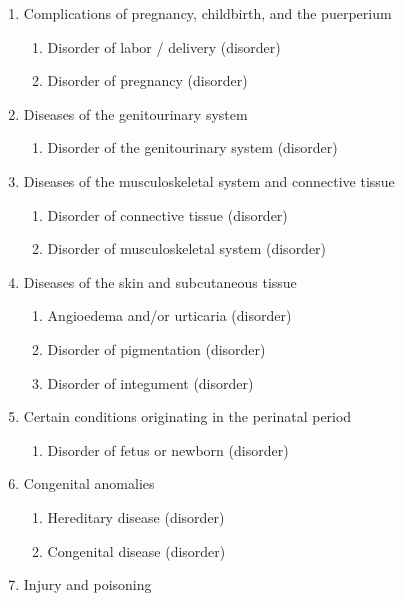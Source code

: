 \documentclass{article}[11pt,oneside]
\begin{document}
\begin{multicols}{2}
\begin{enumerate}
\item Complications of pregnancy, childbirth, and the puerperium 
 \begin{enumerate} 
 \item Disorder of labor / delivery (disorder)  %
 \item Disorder of pregnancy (disorder) %
 \end{enumerate} 
\item Diseases of the genitourinary system 
 \begin{enumerate} 
 \item Disorder of the genitourinary system (disorder) %
 \end{enumerate} 
\item Diseases of the musculoskeletal system and connective tissue 
 \begin{enumerate} 
 \item Disorder of connective tissue (disorder) %
 \item Disorder of musculoskeletal system (disorder) %
 \end{enumerate} 
\item Diseases of the skin and subcutaneous tissue 
 \begin{enumerate} 
 \item Angioedema and/or urticaria (disorder) %
 \item Disorder of pigmentation (disorder) %
 \item Disorder of integument (disorder) %
 \end{enumerate} 
\item Certain conditions originating in the perinatal period 
 \begin{enumerate} 
 \item Disorder of fetus or newborn (disorder) %
 \end{enumerate} 
\item Congenital anomalies 
 \begin{enumerate} 
 \item Hereditary disease (disorder) %
 \item Congenital disease (disorder) %
 \end{enumerate} 
\item Injury and poisoning 

\end{enumerate}
\end{multicols}
\end{document}

